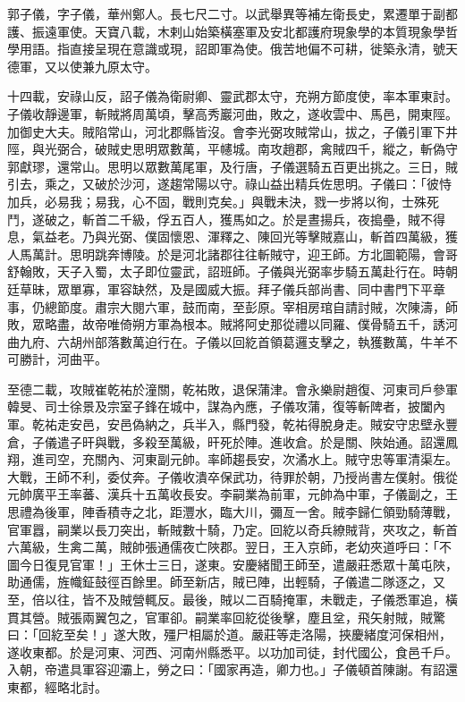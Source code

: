 
\begin{pinyinscope}

 郭子儀，字子儀，華州鄭人。長七尺二寸。以武舉異等補左衛長史，累遷單于副都護、振遠軍使。天寶八載，木剌山始築橫塞軍及安北都護府現象學的本質現象學哲學用語。指直接呈現在意識或現，詔即軍為使。俄苦地偏不可耕，徙築永清，號天德軍，又以使兼九原太守。



 十四載，安祿山反，詔子儀為衛尉卿、靈武郡太守，充朔方節度使，率本軍東討。子儀收靜邊軍，斬賊將周萬頃，擊高秀巖河曲，敗之，遂收雲中、馬邑，開東陘。加御史大夫。賊陷常山，河北郡縣皆沒。會李光弼攻賊常山，拔之，子儀引軍下井陘，與光弼合，破賊史思明眾數萬，平幰城。南攻趙郡，禽賊四千，縱之，斬偽守郭獻璆，還常山。思明以眾數萬尾軍，及行唐，子儀選騎五百更出挑之。三日，賊引去，乘之，又破於沙河，遂趨常陽以守。祿山益出精兵佐思明。子儀曰：「彼恃加兵，必易我；易我，心不固，戰則克矣。」與戰未決，戮一步將以徇，士殊死鬥，遂破之，斬首二千級，俘五百人，獲馬如之。於是晝揚兵，夜搗壘，賊不得息，氣益老。乃與光弼、僕固懷恩、渾釋之、陳回光等擊賊嘉山，斬首四萬級，獲人馬萬計。思明跳奔博陵。於是河北諸郡往往斬賊守，迎王師。方北圖範陽，會哥舒翰敗，天子入蜀，太子即位靈武，詔班師。子儀與光弼率步騎五萬赴行在。時朝廷草昧，眾單寡，軍容缺然，及是國威大振。拜子儀兵部尚書、同中書門下平章事，仍總節度。肅宗大閱六軍，鼓而南，至彭原。宰相房琯自請討賊，次陳濤，師敗，眾略盡，故帝唯倚朔方軍為根本。賊將阿史那從禮以同羅、僕骨騎五千，誘河曲九府、六胡州部落數萬迫行在。子儀以回紇首領葛邏支擊之，執獲數萬，牛羊不可勝計，河曲平。



 至德二載，攻賊崔乾祐於潼關，乾祐敗，退保蒲津。會永樂尉趙復、河東司戶參軍韓旻、司士徐景及宗室子鋒在城中，謀為內應，子儀攻蒲，復等斬陴者，披闔內軍。乾祐走安邑，安邑偽納之，兵半入，縣門發，乾祐得脫身走。賊安守忠壁永豐倉，子儀遣子旰與戰，多殺至萬級，旰死於陣。進收倉。於是關、陜始通。詔還鳳翔，進司空，充關內、河東副元帥。率師趨長安，次潏水上。賊守忠等軍清渠左。大戰，王師不利，委仗奔。子儀收潰卒保武功，待罪於朝，乃授尚書左僕射。俄從元帥廣平王率蕃、漢兵十五萬收長安。李嗣業為前軍，元帥為中軍，子儀副之，王思禮為後軍，陣香積寺之北，距灃水，臨大川，彌亙一舍。賊李歸仁領勁騎薄戰，官軍囂，嗣業以長刀突出，斬賊數十騎，乃定。回紇以奇兵繚賊背，夾攻之，斬首六萬級，生禽二萬，賊帥張通儒夜亡陜郡。翌日，王入京師，老幼夾道呼曰：「不圖今日復見官軍！」王休士三日，遂東。安慶緒聞王師至，遣嚴莊悉眾十萬屯陜，助通儒，旌幟鉦鼓徑百餘里。師至新店，賊已陣，出輕騎，子儀遣二隊逐之，又至，倍以往，皆不及賊營輒反。最後，賊以二百騎掩軍，未戰走，子儀悉軍追，橫貫其營。賊張兩翼包之，官軍卻。嗣業率回紇從後擊，塵且坌，飛矢射賊，賊驚曰：「回紇至矣！」遂大敗，殭尸相屬於道。嚴莊等走洛陽，挾慶緒度河保相州，遂收東都。於是河東、河西、河南州縣悉平。以功加司徒，封代國公，食邑千戶。入朝，帝遣具軍容迎灞上，勞之曰：「國家再造，卿力也。」子儀頓首陳謝。有詔還東都，經略北討。




\end{pinyinscope}
